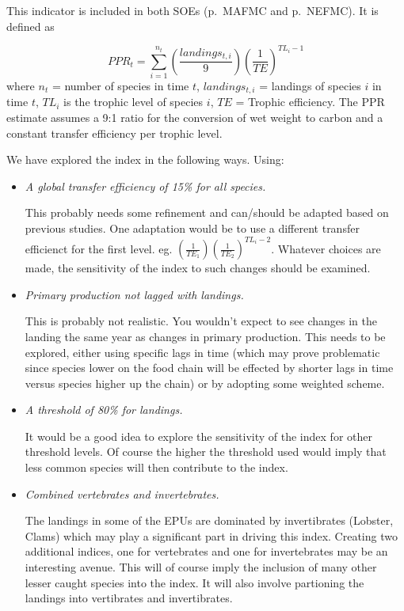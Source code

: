 \documentclass[
  10pt,
]{article}
\begin{document}
This indicator is included in both SOEs (p.~MAFMC and p.~NEFMC). It is
defined as

\[PPR_t = \sum_{i=1}^{n_t}  \left(\frac{landings_{t,i}}{9}\right) \left(\frac{1}{TE}\right)^{TL_i-1}\]
where \(n_t\) = number of species in time \(t\), \(landings_{t,i}\) =
landings of species \(i\) in time \(t\), \(TL_i\) is the trophic level
of species \(i\), \(TE\) = Trophic efficiency. The PPR estimate assumes
a 9:1 ratio for the conversion of wet weight to carbon and a constant
transfer efficiency per trophic level.

We have explored the index in the following ways. Using:

\begin{itemize}
\item
  \emph{A global transfer efficiency of 15\% for all species.}

  This probably needs some refinement and can/should be adapted based on
  previous studies. One adaptation would be to use a different transfer
  efficienct for the first level. eg.
  \(\left( \frac{1}{TE_1}\right) \left(\frac{1}{TE_2}\right)^{TL_i-2}\).
  Whatever choices are made, the sensitivity of the index to such
  changes should be examined.
\item
  \emph{Primary production not lagged with landings.}

  This is probably not realistic. You wouldn't expect to see changes in
  the landing the same year as changes in primary production. This needs
  to be explored, either using specific lags in time (which may prove
  problematic since species lower on the food chain will be effected by
  shorter lags in time versus species higher up the chain) or by
  adopting some weighted scheme.
\item
  \emph{A threshold of 80\% for landings.}

  It would be a good idea to explore the sensitivity of the index for
  other threshold levels. Of course the higher the threshold used would
  imply that less common species will then contribute to the index.
\item
  \emph{Combined vertebrates and invertebrates.}

  The landings in some of the EPUs are dominated by invertibrates
  (Lobster, Clams) which may play a significant part in driving this
  index. Creating two additional indices, one for vertebrates and one
  for invertebrates may be an interesting avenue. This will of course
  imply the inclusion of many other lesser caught species into the
  index. It will also involve partioning the landings into vertibrates
  and invertibrates.
\end{itemize}
\end{document}
